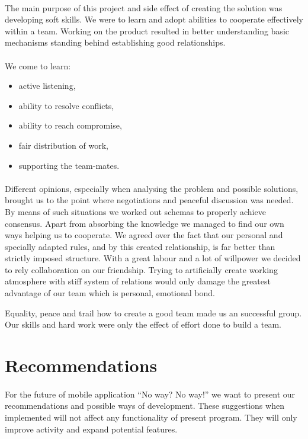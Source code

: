 \documentclass[12pt]{article}
\begin{document}
\paragraph{}
The main purpose of this project and side effect of creating the solution was developing soft skills.
We were to learn and adopt abilities to cooperate effectively within a team.
Working on the product resulted in better understanding basic mechanisms standing behind establishing good relationships.

\paragraph{}
We come to learn:
\begin{itemize}
	\item active listening,
	\item ability to resolve conflicts,
	\item ability to reach compromise,
	\item fair distribution of work,
	\item supporting the team-mates.
\end{itemize}

\paragraph{}
Different opinions, especially when analysing the problem and possible solutions, brought us to the point where negotiations and peaceful discussion was needed.
By means of such situations we worked out schemas to properly achieve consensus.
Apart from absorbing the knowledge we managed to find our own ways helping us to cooperate.
We agreed over the fact that our personal and specially adapted rules, and by this created relationship, is far better than strictly imposed structure.
With a great labour and a lot of willpower we decided to rely collaboration on our friendship.
Trying to artificially create working atmosphere with stiff system of relations would only damage the greatest advantage of our team which is personal, emotional bond.

Equality, peace and trail how to create a good team made us an successful group.
Our skills and hard work were only the effect of effort done to build a team.

\section{Recommendations}
\paragraph{}
 For the future of mobile application ``No way? No way!'' we want to present our recommendations and possible ways of development.
These suggestions when implemented will not affect any functionality of present program.
They will only improve activity and expand potential features.
\end{document}
